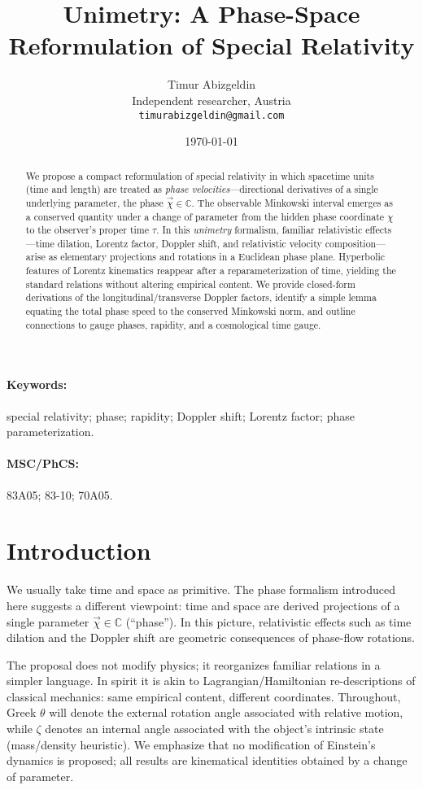\documentclass[11pt]{article}
\title{Unimetry: A Phase-Space Reformulation of Special Relativity}
\author{Timur Abizgeldin\\ \small Independent researcher, Austria\\ \small \texttt{timurabizgeldin@gmail.com}}
\date{\today}
\numberwithin{equation}{section}
\begin{document}
\maketitle

\begin{abstract}
We propose a compact reformulation of special relativity in which spacetime units (time and length) are treated as \emph{phase velocities}---directional derivatives of a single underlying parameter, the phase $\vec{\chi}\in\mathbb{C}$. The observable Minkowski interval emerges as a conserved quantity under a change of parameter from the hidden phase coordinate $\chi$ to the observer's proper time $\tau$. In this \emph{unimetry} formalism, familiar relativistic effects---time dilation, Lorentz factor, Doppler shift, and relativistic velocity composition---arise as elementary projections and rotations in a Euclidean phase plane. Hyperbolic features of Lorentz kinematics reappear after a reparameterization of time, yielding the standard relations without altering empirical content. We provide closed-form derivations of the longitudinal/transverse Doppler factors, identify a simple lemma equating the total phase speed to the conserved Minkowski norm, and outline connections to gauge phases, rapidity, and a cosmological time gauge.
\end{abstract}

\paragraph{Keywords:} special relativity; phase; rapidity; Doppler shift; Lorentz factor; phase parameterization.

\paragraph{MSC/PhCS:} 83A05; 83-10; 70A05.


\section{Introduction}

We usually take time and space as primitive. The phase formalism introduced here suggests a
different viewpoint: time and space are derived projections of a single parameter $\vec{\chi}\in\mathbb{C}$ (``phase'').
In this picture, relativistic effects such as time dilation and the Doppler shift are geometric
consequences of phase-flow rotations.

The proposal does not modify physics; it reorganizes familiar relations in a simpler language.
In spirit it is akin to Lagrangian/Hamiltonian re-descriptions of classical mechanics: same
empirical content, different coordinates. Throughout, Greek $\theta$ will denote the external rotation
angle associated with relative motion, while $\zeta$ denotes an internal angle associated with the
object's intrinsic state (mass/density heuristic). We emphasize that no modification of Einstein's
dynamics is proposed; all results are kinematical identities obtained by a change of parameter.
\end{document}
